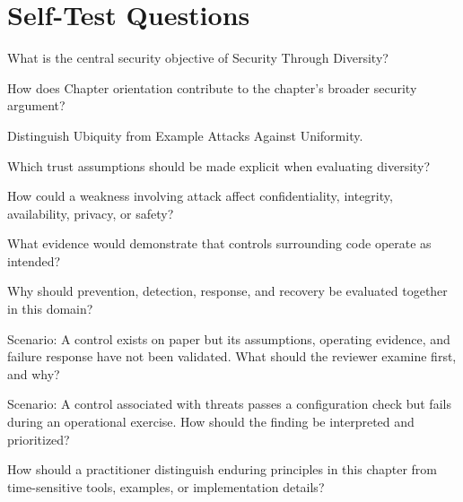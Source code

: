 \documentclass[11pt,letterpaper]{article}
\begin{document}
\section*{Self-Test Questions}
\begin{CornellRecallList}
\item What is the central security objective of Security Through Diversity?
\item How does Chapter orientation contribute to the chapter's broader security argument?
\item Distinguish Ubiquity from Example Attacks Against Uniformity.
\item Which trust assumptions should be made explicit when evaluating diversity?
\item How could a weakness involving attack affect confidentiality, integrity, availability, privacy, or safety?
\item What evidence would demonstrate that controls surrounding code operate as intended?
\item Why should prevention, detection, response, and recovery be evaluated together in this domain?
\item Scenario: A control exists on paper but its assumptions, operating evidence, and failure response have not been validated. What should the reviewer examine first, and why?
\item Scenario: A control associated with threats passes a configuration check but fails during an operational exercise. How should the finding be interpreted and prioritized?
\item How should a practitioner distinguish enduring principles in this chapter from time-sensitive tools, examples, or implementation details?
\end{CornellRecallList}
\end{document}
